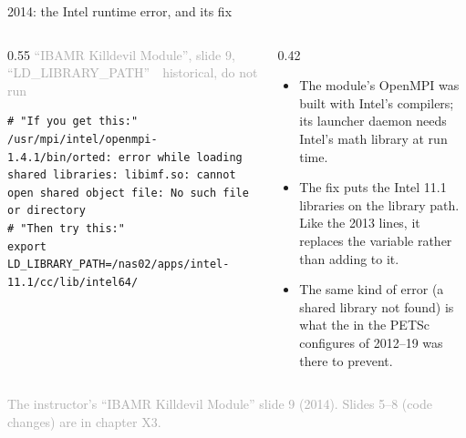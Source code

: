 \documentclass[aspectratio=169,11pt]{beamer}
\newcommand{\sourcecredit}[1]{\vfill\begin{flushright}\tiny\textcolor{DarkGray}{#1}\end{flushright}}
\newcommand{\hist}[1]{{\tiny\sffamily\textcolor{DarkGray}{#1\ \textbullet\ historical, do not run}}\par\nointerlineskip\vspace{0.3mm}}
\begin{document}
\begin{frame}[fragile]{2014: the Intel runtime error, and its fix}
\label{fr:libimf}
\begin{columns}[T,onlytextwidth]
\begin{column}{0.55\textwidth}
\hist{``IBAMR Killdevil Module'', slide 9, ``LD\_LIBRARY\_PATH''}
\begin{lstlisting}[style=hist]
# "If you get this:"
/usr/mpi/intel/openmpi-1.4.1/bin/orted: error while loading shared libraries: libimf.so: cannot open shared object file: No such file or directory
# "Then try this:"
export LD_LIBRARY_PATH=/nas02/apps/intel-11.1/cc/lib/intel64/
\end{lstlisting}
\end{column}
\begin{column}{0.42\textwidth}
\footnotesize
\begin{itemize}\setlength{\itemsep}{2pt}
  \item The module's OpenMPI was built with Intel's compilers; its launcher daemon  needs Intel's math library  at run time.
  \item The fix puts the Intel 11.1 libraries on the library path. Like the 2013  lines, it replaces the variable rather than adding to it.
  \item The same kind of error (a shared library not found) is what the  in the PETSc configures of 2012--19 was there to prevent.
\end{itemize}
\end{column}
\end{columns}
\sourcecredit{The instructor's ``IBAMR Killdevil Module'' slide 9 (2014). Slides 5--8 (code changes) are in chapter X3.}
\end{frame}
\end{document}
